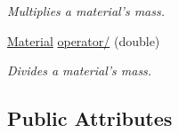 \begin{DoxyCompactItemize}
\begin{DoxyCompactList}\small\item\em Multiplies a material's mass. \end{DoxyCompactList}\item 
\hypertarget{classpyne_1_1_material_ac9b6ba67915ed4adb763b1c68ef5eb98}{\hyperlink{classpyne_1_1_material}{Material} \hyperlink{classpyne_1_1_material_ac9b6ba67915ed4adb763b1c68ef5eb98}{operator/} (double)}\label{classpyne_1_1_material_ac9b6ba67915ed4adb763b1c68ef5eb98}

\begin{DoxyCompactList}\small\item\em Divides a material's mass. \end{DoxyCompactList}\end{DoxyCompactItemize}
\subsection*{Public Attributes}
